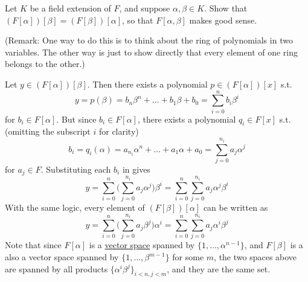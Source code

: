   \begin{exercise}[Shifrin 3.2.13]
    Let $K$ be a field extension of $F$, and suppose $\alpha, \beta \in K$. Show that $(F[\alpha])[\beta] = (F[\beta])[\alpha]$, so that $F[\alpha, \beta]$ makes good sense.
    
    (Remark: One way to do this is to think about the ring of polynomials in two variables. The other way is just to show directly that every element of one ring belongs to the other.)
  \end{exercise}
  \begin{solution}
    Let $y \in (F[\alpha])[\beta]$. Then there exists a polynomial $p \in (F[\alpha])[x]$ s.t. 
    \begin{equation}
      y = p(\beta) = b_n \beta^n + \ldots + b_1 \beta + b_0 = \sum_{i=0}^n b_i \beta^i 
    \end{equation}
    for $b_i \in F[\alpha]$. But since $b_i \in F[\alpha]$, there exists a polynomial $q_i \in F[x]$ s.t. (omitting the subscript $i$ for clarity)
    \begin{equation}
      b_i = q_i (\alpha) = a_{n_i} \alpha^n + \ldots + a_1 \alpha + a_0 = \sum_{j=0}^{n_i} a_{j} \alpha^j 
    \end{equation}
    for $a_j \in F$. Substituting each $b_i$ in gives   
    \begin{equation}
      y = \sum_{i=0}^n \bigg( \sum_{j=0}^{n_i} a_j \alpha^j \bigg) \beta^i = \sum_{i=0}^n \sum_{j=0}^{n_i} a_j \alpha^j \beta^i
    \end{equation}
    With the same logic, every element of $(F[\beta])[\alpha]$ can be written as 
    \begin{equation}
      y = \sum_{i=0}^n \bigg( \sum_{j=0}^{n_i} a_j \beta^j \bigg) \alpha^i = \sum_{i=0}^n \sum_{j=0}^{n_i} a_j \alpha^i \beta^j
    \end{equation}
    Note that since $F[\alpha]$ is a \hyperref[st-def:vector-space]{vector space} spanned by $\{1, \ldots, \alpha^{n-1}\}$, and $F[\beta]$ is a also a vector space spanned by $\{1, \ldots, \beta^{m-1}\}$ for some $m$, the two spaces above are spanned by all products $\{\alpha^i \beta^j\}_{i < n, j < m}$, and they are the same set. 
  \end{solution}

